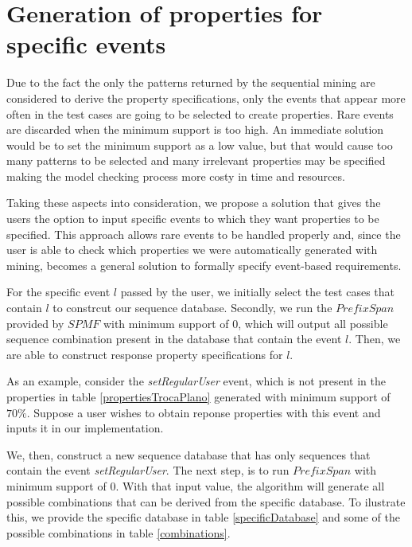 \section{Generation of properties for specific events}
\label{sec-genpropspecific}

Due to the fact the only the patterns returned by the sequential mining are considered to derive the property specifications, only the events that appear more often in the test cases are going to be selected to create properties. Rare events are discarded when the minimum support is too high. An immediate solution would be to set the minimum support as a low value, but that would cause too many patterns to be selected and many irrelevant properties may be specified making the model checking process more costy in time and resources.

Taking these aspects into consideration, we propose a solution that gives the users the option to input specific events to which they want properties to be specified. This approach allows rare events to be handled properly and, since the user is able to check which properties we were automatically generated with mining, becomes a general solution to formally specify event-based requirements.

For the specific event $l$ passed by the user, we initially select the test cases that contain $l$ to constrcut our sequence database. Secondly, we run the $PrefixSpan$ provided by $SPMF$ with minimum support of $0$, which will output all possible sequence combination present in the database that contain the event $l$. Then, we are able to construct response property specifications for $l$.

As an example, consider the \textit{setRegularUser} event, which is not present in the properties in table \ref{propertiesTrocaPlano} generated with minimum support of $70\%$. Suppose a user wishes to obtain reponse properties with this event and inputs it in our implementation.

We, then, construct a new sequence database that has only sequences that contain the event \textit{setRegularUser}. The next step, is to run $PrefixSpan$ with minimum support of 0. With that input value, the algorithm will generate all possible combinations that can be derived from the specific database. To ilustrate this, we provide the specific database in table \ref{specificDatabase} and some of the possible combinations in table \ref{combinations}.

